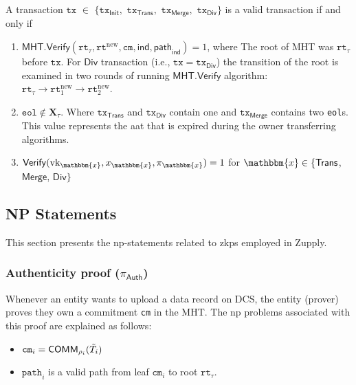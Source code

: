 \begin{definition}
	\label{def:Valid Transaction}
	A transaction $\texttt{tx} $ $ \in $ $ \{ \texttt{tx}_\textsf{Init}, $ $ \texttt{tx}_\textsf{Trans}, $ $ \texttt{tx}_\textsf{Merge}, $ $ \texttt{tx}_\textsf{Div} \}$ is a valid transaction if and only if
	\begin{enumerate}
		\item $\mathsf{MHT}.\mathsf{Verify}(\texttt{rt}_{\tau}, \texttt{rt}^\text{new}, \texttt{cm}, \mathsf{ind}, \mathsf{path}_\mathsf{ind}) = 1$, where The root of \textsf{MHT} was $\texttt{rt}_{\tau}$ before $\texttt{tx}$. For $\textsf{Div}$ transaction (i.e., $\texttt{tx}= \texttt{tx}_\textsf{Div}$) the transition of the root is examined in two rounds of running $\mathsf{MHT}.\mathsf{Verify}$ algorithm: $\texttt{rt}_\tau \rightarrow \texttt{rt}^\text{new}_1 \rightarrow \texttt{rt}^\text{new}_2$. 
		
		
		\item $\texttt{eol} \notin  \mathbf{X}_\tau$. Where $\texttt{tx}_\mathsf{Trans}$ and $\texttt{tx}_\mathsf{Div}$ contain one and $\texttt{tx}_\mathsf{Merge}$ contains two \texttt{eol}s. This value represents the \gls{aat} that is expired during the owner transferring algorithms.
		
		\item $\mathsf{Verify}(\text{vk}_\mathbbm{x}, x_\mathbbm{x}, \pi_\mathbbm{x}) = 1$ for $\mathbbm{x} \in \{\mathsf{Trans}$, $\mathsf{Merge}$, $\mathsf{Div} \}$
		
	\end{enumerate}
\end{definition}




\subsection{NP Statements}
\label{sec:Zero-knowledge Proofs}
This section presents the \gls{np}-statements related to \gls{zkp}s employed in Zupply. 


\subsubsection{Authenticity proof ($\pi_\textsf{Auth}$)}
Whenever an entity wants to upload a data record on DCS, the entity (prover) proves they own a commitment \texttt{cm} in the \textsf{MHT}. The \gls{np} problems associated with this proof are explained as follows:

    
\begin{itemize}

    \item $\texttt{cm}_i =\mathsf{COMM}_{\rho_i}(\Tilde{T}_i)$
	\item $\texttt{path}_i$ is a valid path from leaf  $\texttt{cm}_i$ to root $\texttt{rt}_\tau$.
\end{itemize}

